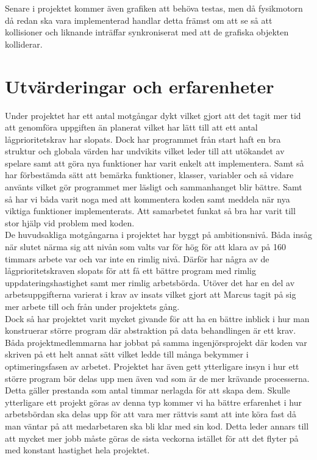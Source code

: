 \documentclass[12pt,a4paper]{article}
\begin{document}
Senare i projektet kommer även grafiken att behöva testas, men då fysikmotorn då redan ska vara implementerad handlar detta främst om att se så att kollisioner och liknande inträffar synkroniserat med att de grafiska objekten kolliderar. \\

\section{Utvärderingar och erfarenheter}
    
Under projektet har ett antal motgångar dykt vilket gjort att det tagit mer tid att genomföra uppgiften än planerat vilket har lätt till att ett antal lågprioritetskrav har slopats. Dock har programmet från start haft en bra struktur och globala värden har undvikits vilket leder till att utökandet av spelare samt att göra nya funktioner har varit enkelt att implementera. Samt så har förbestämda sätt att bemärka funktioner, klasser, variabler och så vidare använts vilket gör programmet mer läsligt och sammanhanget blir bättre. Samt så har vi båda varit noga med att kommentera koden samt meddela när nya viktiga funktioner implementerats.  Att samarbetet funkat så bra har varit till stor hjälp vid problem med koden. \\

De huvudsakliga motgångarna i projektet har byggt på ambitionsnivå. Båda insåg när slutet närma sig att nivån som valts var för hög för att klara av på 160 timmars arbete var och var inte en rimlig nivå. Därför har några av de lågprioritetskraven slopats för att få ett bättre program med rimlig uppdateringshastighet samt mer rimlig arbetsbörda. Utöver det har en del av arbetsuppgifterna varierat i krav av insats vilket gjort att Marcus tagit på sig mer arbete till och från under projektets gång. \\

Dock så har projektet varit mycket givande för att ha en bättre inblick i hur man konstruerar större program där abstraktion på data behandlingen är ett krav. Båda projektmedlemmarna har jobbat på samma ingenjörsprojekt där koden var skriven på ett helt annat sätt vilket ledde till många bekymmer i optimeringsfasen av arbetet. Projektet har även gett ytterligare insyn i hur ett större program bör delas upp men även vad som är de mer krävande processerna. Detta gäller prestanda som antal timmar nerlagda för att skapa dem. Skulle ytterligare ett projekt göras av denna typ kommer vi ha bättre erfarenhet i hur arbetsbördan ska delas upp för att vara mer rättvis samt att inte köra fast då man väntar på att medarbetaren ska bli klar med sin kod. Detta leder annars till att mycket mer jobb måste göras de sista veckorna istället för att det flyter på med konstant hastighet hela projektet. \\
\end{document}
